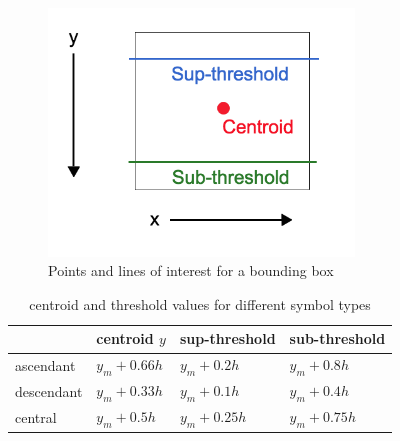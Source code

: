 \documentclass[10pt]{IEEEtran}
\begin{document}
\begin{figure}[h]
  \centering
    \includegraphics[width=3.2in]{values.png}
  \caption{Points and lines of interest for a bounding box}
  \label{fig:values}
\end{figure}

\begin{table}[h]
  \caption{centroid and threshold values for different symbol types}
  \centering
  \begin{tabular}{l l l l}
  \hline
  & centroid $y$ & sup-threshold & sub-threshold\\
  \hline
  ascendant & $y_m + 0.66h$ & $y_m + 0.2h$ & $y_m+0.8h$\\
  descendant & $y_m+ 0.33h$ & $y_m +0.1h$ & $y_m+0.4h$\\
  central & $y_m+0.5h$ & $y_m+0.25h$ & $y_m+0.75h$\\
  \hline
  \end{tabular}
  \label{tab:values}
\end{table}
\end{document}

